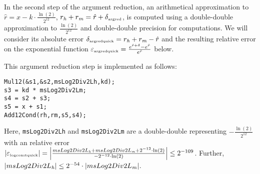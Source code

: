 In the second step of the argument reduction, an arithmetical
approximation to $\hat{r} = x - k \cdot \frac{\ln\left( 2
\right)}{2^{12}}$, $r_\hi + r_\mi = \hat{r} + \delta_{\mbox{\tiny
argred}}$, is computed using a double-double approximation to
$\frac{\ln\left( 2 \right)}{2^{12}}$ and double-double precision for
computations. We will consider its absolute error $\delta_{\mbox{\tiny
argredquick}} = r_\hi + r_\mi - \hat{r}$ and the resulting relative
error on the exponential function $\epsilon_{\mbox{\tiny argredquick}}
= \frac{e^{\hat{r} + \delta} - e^{\hat{r}}}{e^{\hat{r}}}$ below.

This argument reduction step is implemented as follows:
\begin{lstlisting}[caption={Argument reduction - second step},firstnumber=1]
Mul12(&s1,&s2,msLog2Div2Lh,kd);
s3 = kd * msLog2Div2Lm;
s4 = s2 + s3; 
s5 = x + s1;
Add12Cond(rh,rm,s5,s4);
\end{lstlisting}
Here, \texttt{msLog2Div2Lh} and \texttt{msLog2Div2Lm} are a
double-double representing $-\frac{\ln\left( 2 \right)}{2^{12}}$ with
an relative error $\left \vert \epsilon_{\mbox{\tiny logconstquick}}
\right \vert = \left \vert \frac{msLog2Div2L_\hi + msLog2Div2L_\mi +
2^{-12} \cdot \ln\left( 2 \right)}{-2^{-12} \cdot \ln\left( 2 \right)}
\right \vert \leq 2^{-109}$. Further, $\left \vert msLog2Div2L_\hi
\right \vert \leq 2^{-54} \cdot \left \vert msLog2Div2L_\mi \right
\vert$.

